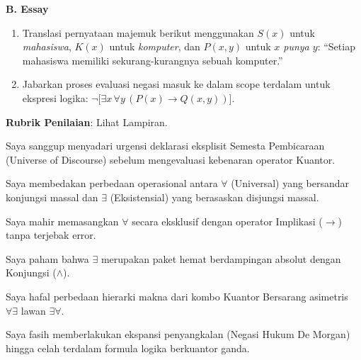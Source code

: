 \documentclass[../main]{subfiles}
\begin{document}
\begin{asesmen}
\textbf{B. Essay}
\begin{enumerate}
  \item Translasi pernyataan majemuk berikut menggunakan $S(x)$ untuk \textit{mahasiswa}, $K(x)$ untuk \textit{komputer}, dan $P(x,y)$ untuk \textit{$x$ punya $y$}: ``Setiap mahasiswa memiliki sekurang-kurangnya sebuah komputer.''
  \item Jabarkan proses evaluasi negasi masuk ke dalam scope terdalam untuk ekspresi logika: $\neg \Big[ \exists x \, \forall y \, (P(x) \rightarrow Q(x,y)) \Big]$.
\end{enumerate}

\textbf{Rubrik Penilaian}: Lihat Lampiran.
\end{asesmen}


\begin{checklist}
  \item Saya sanggup menyadari urgensi deklarasi eksplisit Semesta Pembicaraan (Universe of Discourse) sebelum mengevaluasi kebenaran operator Kuantor.
  \item Saya membedakan perbedaan operasional antara $\forall$ (Universal) yang bersandar konjungsi massal dan $\exists$ (Eksistensial) yang berasaskan disjungsi massal.
  \item Saya mahir memasangkan $\forall$ secara eksklusif dengan operator Implikasi ($\rightarrow$) tanpa terjebak error.
  \item Saya paham bahwa $\exists$ merupakan paket hemat berdampingan absolut dengan Konjungsi ($\land$).
  \item Saya hafal perbedaan hierarki makna dari kombo Kuantor Bersarang asimetris $\forall \exists$ lawan $\exists \forall$.
  \item Saya fasih memberlakukan ekspansi penyangkalan (Negasi Hukum De Morgan) hingga celah terdalam formula logika berkuantor ganda.
\end{checklist}

\end{document}
